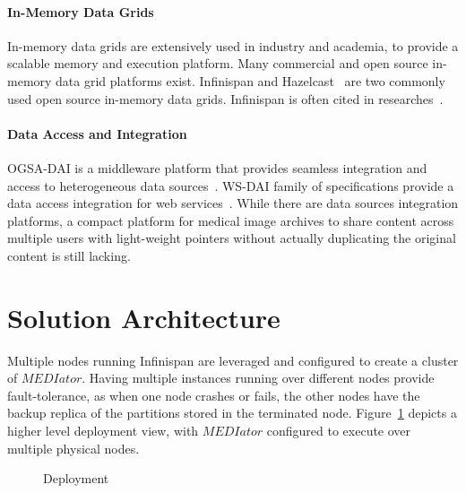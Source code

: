 \documentclass[conference]{IEEEtran}
\begin{document}
\paragraph*{\textbf{In-Memory Data Grids}}
In-memory data grids are extensively used in industry and academia, to provide a scalable memory and execution platform. Many commercial and open source in-memory data grid platforms exist. Infinispan and Hazelcast~\cite{hazelcast} are two commonly used open source in-memory data grids. Infinispan is often cited in researches~\cite{palmieri2012integrated,rosa2011goal,ruivo2011exploiting}.

\paragraph*{\textbf{Data Access and Integration}}
OGSA-DAI is a middleware platform that provides seamless integration and access to heterogeneous data sources~\cite{antonioletti2005design}. WS-DAI family of specifications provide a data access integration for web services~\cite{antonioletti2006ws}. While there are data sources integration platforms, a compact platform for medical image archives to share content across multiple users with light-weight pointers without actually duplicating the original content is still lacking.


\section{Solution Architecture}

Multiple nodes running Infinispan are leveraged and configured to create a cluster of $MEDIator$. Having multiple instances running over different nodes provide fault-tolerance, as when one node crashes or fails, the other nodes have the backup replica of the partitions stored in the terminated node. Figure~\ref{fig:deployment} depicts a higher level deployment view, with $MEDIator$ configured to execute over multiple physical nodes.
\begin{figure}[!h]
\begin{center}
\end{center}
 \caption{Deployment}
 \label{fig:deployment}
 \vspace{-18pt}
\end{figure}
\end{document}
